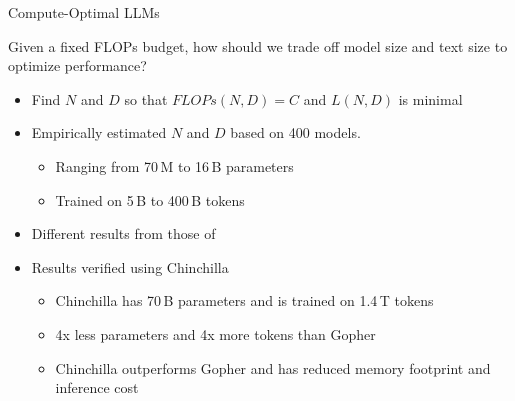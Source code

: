 
\begin{vbframe}{Compute-Optimal LLMs}

Given a fixed FLOPs budget, how should we trade off model size and text size to optimize performance? 

\vfill

\begin{itemize}

	\item Find $N$ and $D$ so that $FLOPs(N,D) = C$ and $L(N,D)$ is minimal

	\item Empirically estimated $N$ and $D$ based on 400 models. 
	\begin{itemize}
	\item Ranging from 70\,M to 16\,B parameters
	\item Trained on 5\,B to 400\,B tokens
	\end{itemize}

	\item Different results from those of  
	\item Results verified using Chinchilla
	\begin{itemize}
	\item Chinchilla has 70\,B parameters and is trained on 1.4\,T tokens
	\item 4x less parameters and 4x more tokens than Gopher
	\item Chinchilla outperforms Gopher and has reduced memory footprint and inference cost 
	\end{itemize}

\end{itemize}

\vfill

\end{vbframe}



